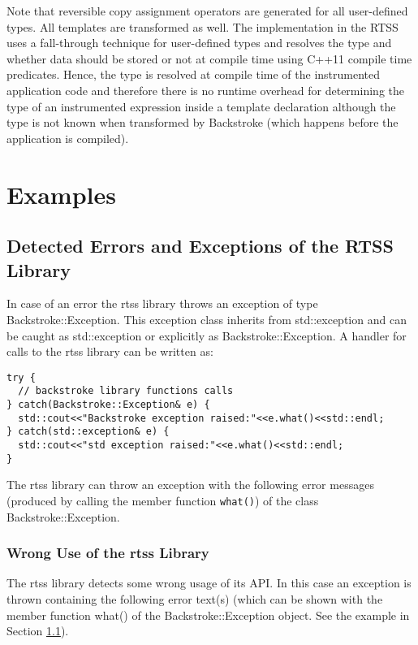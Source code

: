 \documentclass[english,12pt, titlepage]{article}      %
\begin{document}
Note that reversible copy assignment operators are generated for all
user-defined types. All templates are transformed as well. The
implementation in the RTSS uses a fall-through technique for
user-defined types and resolves the type and whether data should be
stored or not at compile time using C++11 compile time
predicates. Hence, the type is resolved at compile time of the
instrumented application code and therefore there is no runtime
overhead for determining the type of an instrumented expression inside
a template declaration although the type is not known when transformed
by Backstroke (which happens before the application is compiled).

\section{Examples}

\subsection{Detected Errors and Exceptions of the RTSS Library}
\label{section:errorsandexceptions}
In case of an error the rtss library throws an exception of type
Backstroke::Exception. This exception class inherits from
std::exception and can be caught as std::exception or explicitly as
Backstroke::Exception. A handler for calls to the rtss library can be written as:

{
\footnotesize
\begin{verbatim}
try {
  // backstroke library functions calls
} catch(Backstroke::Exception& e) {
  std::cout<<"Backstroke exception raised:"<<e.what()<<std::endl;
} catch(std::exception& e) {
  std::cout<<"std exception raised:"<<e.what()<<std::endl;
}
\end{verbatim}
}

The rtss library can throw an exception with the following
error messages (produced by calling the member function \verb+what()+)
of the class Backstroke::Exception.

\subsubsection{Wrong Use of the rtss Library}

The rtss library detects some wrong usage of its API. In this case an exception is thrown containing the following error text(s) (which can be shown with the member function what() of the Backstroke::Exception object. See the example in Section \ref{section:errorsandexceptions}).
\end{document}
